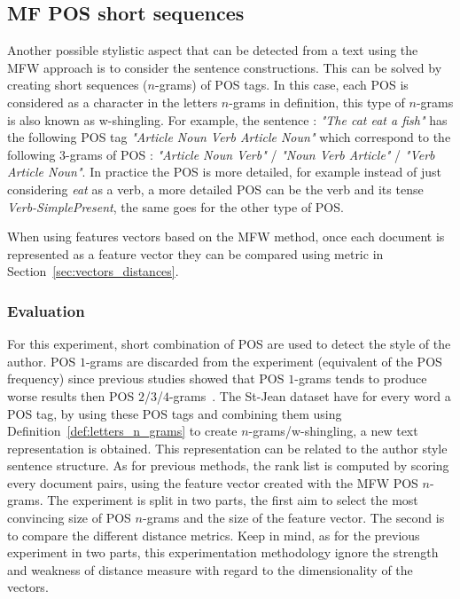 \subsection{MF POS short sequences \label{sec:pos_short_sequences}}

Another possible stylistic aspect that can be detected from a text using the MFW approach is to consider the sentence constructions.
This can be solved by creating short sequences ($n$-grams) of POS tags.
In this case, each POS is considered as a character in the letters $n$-grams in definition, this type of $n$-grams is also known as w-shingling.
For example, the sentence : \textit{"The cat eat a fish"} has the following POS tag \textit{"Article Noun Verb Article Noun"} which correspond to the following 3-grams of POS : \textit{"Article Noun Verb"} / \textit{"Noun Verb Article"} / \textit{"Verb Article Noun"}.
In practice the POS is more detailed, for example instead of just considering \textit{eat} as a verb, a more detailed POS can be the verb and its tense \textit{Verb-SimplePresent}, the same goes for the other type of POS.

When using features vectors based on the MFW method, once each document is represented as a feature vector they can be compared using metric in Section~\ref{sec:vectors_distances}.

\subsubsection{Evaluation}

For this experiment, short combination of POS are used to detect the style of the author.
POS $1$-grams are discarded from the experiment (equivalent of the POS frequency) since previous studies showed that POS $1$-grams tends to produce worse results then POS $2$/$3$/$4$-grams~\cite{kocher_linking}.
The St-Jean dataset have for every word a POS tag, by using these POS tags and combining them using Definition~\ref{def:letters_n_grams} to create $n$-grams/w-shingling, a new text representation is obtained.
This representation can be related to the author style sentence structure.
As for previous methods, the rank list is computed by scoring every document pairs, using the feature vector created with the MFW POS $n$-grams.
The experiment is split in two parts, the first aim to select the most convincing size of POS $n$-grams and the size of the feature vector.
The second is to compare the different distance metrics.
Keep in mind, as for the previous experiment in two parts, this experimentation methodology ignore the strength and weakness of distance measure with regard to the dimensionality of the vectors.

